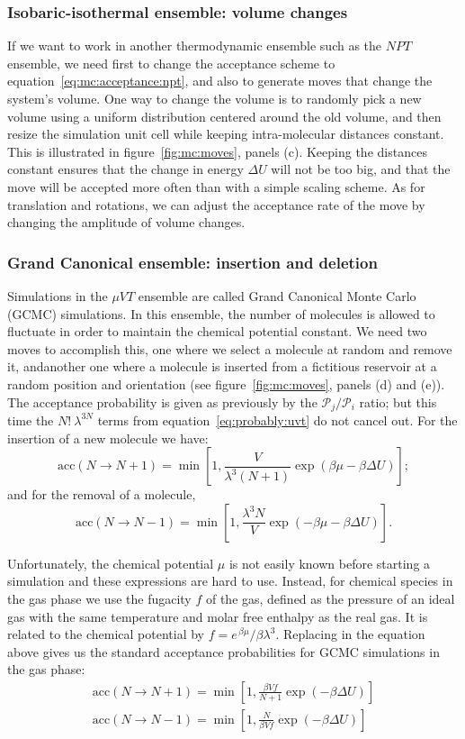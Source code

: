 \documentclass[thesis]{subfiles}
\begin{document}
\subsubsection{Isobaric-isothermal ensemble: volume changes}

If we want to work in another thermodynamic ensemble such as the $NPT$ ensemble,
we need first to change the acceptance scheme to
equation~\eqref{eq:mc:acceptance:npt}, and also to generate moves that change
the system's volume. One way to change the volume is to randomly pick a new
volume using a uniform distribution centered around the old volume, and then
resize the simulation unit cell while keeping intra-molecular distances
constant. This is illustrated in figure~\ref{fig:mc:moves}, panels (c). Keeping
the distances constant ensures that the change in energy $\Delta U$ will not be
too big, and that the move will be accepted more often than with a simple
scaling scheme. As for translation and rotations, we can adjust the acceptance
rate of the move by changing the amplitude of volume changes.

\subsubsection{Grand Canonical ensemble: insertion and deletion}

Simulations in the $\mu VT$ ensemble are called Grand Canonical Monte Carlo
(GCMC) simulations. In this ensemble, the number of molecules is allowed to
fluctuate in order to maintain the chemical potential constant. We need two
moves to accomplish this, one where we select a molecule at random and remove
it, andanother one where a molecule is inserted from a fictitious reservoir at
a random position and orientation (see figure~\ref{fig:mc:moves}, panels (d) and
(e)). The acceptance probability is given as previously by the $\mathcal{P}_j /
\mathcal{P}_i$ ratio; but this time the $N!\ \lambda^{3N}$ terms from
equation~\eqref{eq:probably:uvt} do not cancel out. For the insertion of a new
molecule we have:
\[ \text{acc}(N \to N + 1) = \min\left[1, \frac{V}{\lambda^3 (N + 1)} \exp\left(\beta \mu - \beta \Delta U \right)\right]; \]
and for the removal of a molecule,
\[ \text{acc}(N \to N - 1) = \min\left[1, \frac{\lambda^3 N}{V} \exp\left(-\beta \mu - \beta \Delta U \right)\right]. \]

Unfortunately, the chemical potential $\mu$ is not easily known before starting
a simulation and these expressions are hard to use. Instead, for chemical
species in the gas phase we use the fugacity $f$ of the gas, defined as the
pressure of an ideal gas with the same temperature and molar free enthalpy as
the real gas. It is related to the chemical potential by $f = e^{\,\beta \mu} /
\beta \lambda^3$.  Replacing in the equation above gives us the standard
acceptance probabilities for GCMC simulations in the gas phase:
\begin{gather}
\text{acc}(N \to N + 1) = \min\left[1, \frac{\beta V f}{N + 1} \exp\left(- \beta \Delta U \right)\right] \\
\text{acc}(N \to N - 1) = \min\left[1, \frac{N}{\beta V f} \exp\left(- \beta \Delta U \right)\right]
\end{gather}
\end{document}

